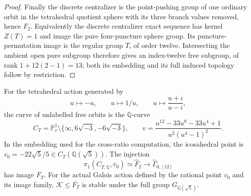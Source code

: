 \begin{proof}
Finally the discrete centralizer is the point-pushing
group of one ordinary orbit in the tetrahedral quotient
sphere with its three branch values removed, hence $F_2$.
Equivalently the discrete centralizer exact sequence has
kernel $Z(T)=1$ and image the pure four-puncture sphere
group.  Its puncture-permutation image is the regular
group $T$, of order twelve.  Intersecting the ambient
open pure subgroup therefore gives an index-twelve
free subgroup, of rank $1+12(2-1)=13$; both its embedding
and its full induced topology follow by restriction.
\end{proof}

For the tetrahedral action generated by
\[
       u\longmapsto-u,\qquad u\longmapsto1/u,
             \qquad u\longmapsto\frac{u+i}{u-i},
\]
the curve of unlabelled free orbits is the $\mathbb Q$-curve
\[
 C_T=\mathbb P^1_v\setminus\{\infty,6\sqrt{-3},-6\sqrt{-3}\},
 \qquad
 v=\frac{u^{12}-33u^8-33u^4+1}{u^2(u^4-1)^2}.              \tag{B.31.1}
\]
In the embedding used for the cross-ratio computation, the
icosahedral point is
$v_0=-22\sqrt5/5\in C_T(\mathbb Q(\sqrt5))$.
The injection
\[
 \pi_1(C_{T,\overline{\mathbb Q}},\overline v_0)
       \simeq\widehat F_2\longrightarrow\widehat\Gamma_{0,[12]}
                                                               \tag{B.31.2}
\]
has image $\overline{F_T}$.  For the actual Galois action
defined by the rational point $v_0$ and its image family,
$\mathcal K\leq\overline{F_T}$ is stable under the full group
$G_{\mathbb Q(\sqrt5)}$.

